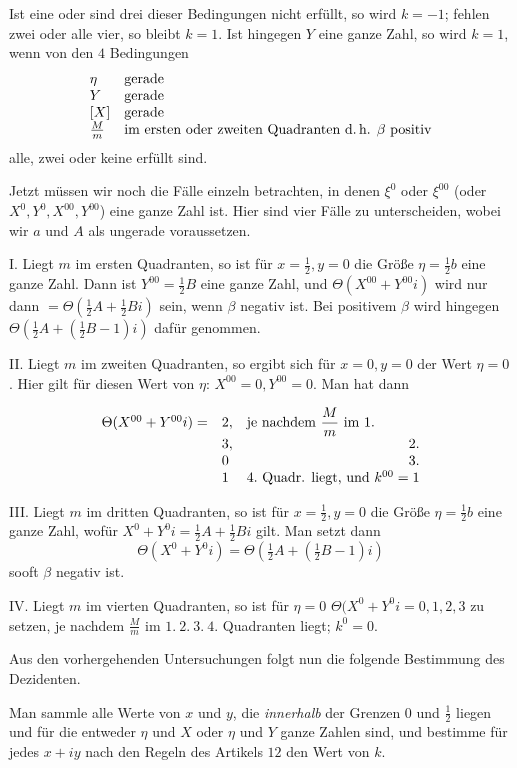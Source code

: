Ist eine oder sind drei dieser Bedingungen nicht erfüllt, so wird $k=-1$; fehlen zwei oder alle vier, so bleibt $k=1$. Ist hingegen $Y$ eine ganze Zahl, so wird $k=1$, wenn von den $4$ Bedingungen
\[
\begin{array}{ll}
\eta&\text{gerade}\\
Y&\text{gerade}\\
\relax[X]&\text{gerade}\\
\frac{M}{m}&\text{im ersten oder zweiten Quadranten d.\,h. }\beta\text{ positiv}
\end{array}
\]
alle, zwei oder keine erfüllt sind.

Jetzt müssen wir noch die Fälle einzeln betrachten, in denen $\xi^0$ oder $\xi^{00}$ (oder $X^0,Y^0,X^{00},Y^{00}$) eine ganze Zahl ist. Hier sind vier Fälle zu unterscheiden, wobei wir $a$ und $A$ als ungerade voraussetzen.

I. Liegt $m$ im ersten Quadranten, so ist für $x=\frac12,y=0$ die Größe $\eta=\frac12b$ eine ganze Zahl. Dann ist $Y^{00}=\frac12B$ eine ganze Zahl, und $\Theta(X^{00}+Y^{00}i)$ wird nur dann $=\Theta(\frac12A+\frac12Bi)$ sein, wenn $\beta$ negativ ist. Bei positivem $\beta$ wird hingegen $\Theta(\frac12A+(\frac12B-1)i)$ dafür genommen.

II. Liegt $m$ im zweiten Quadranten, so ergibt sich für $x=0,y=0$ der Wert $\eta=0$. Hier gilt für diesen Wert von $\eta$: $X^{00}=0,Y^{00}=0$. Man hat dann

\[
\begin{array}{rll}
\Theta(X^{00}+Y^{00}i)=&2,&\text{je nachdem }\dfrac{M}{m}\text{ im }1.\\
&3,&\hfill2.\\
&0&\hfill3.\\
&1&\hfill4.\text{ Quadr. liegt, und }k^{00}=1
\end{array}
\]

III. Liegt $m$ im dritten Quadranten, so ist für $x=\frac12,y=0$ die Größe $\eta=\frac12b$ eine ganze Zahl, wofür $X^0+Y^0i=\frac12A+\frac12Bi$ gilt. Man setzt dann
\[
\Theta(X^0+Y^0i)=\Theta(\tfrac12A+(\tfrac12B-1)i)
\]
sooft $\beta$ negativ ist.

IV. Liegt $m$ im vierten Quadranten, so ist für $\eta=0$
$\Theta(X^0+Y^0i=0,1,2,3$ zu setzen, je nachdem $\frac{M}{m}$ im $1.\ 2.\ 3.\ 4.$ Quadranten liegt;
$k^0=0$.

Aus den vorhergehenden Untersuchungen folgt nun die folgende Bestimmung des Dezidenten.

Man sammle alle Werte von $x$ und $y$, die \emph{innerhalb} der Grenzen $0$ und $\frac12$ liegen und für die entweder $\eta$ und $X$ oder $\eta$ und $Y$ ganze Zahlen sind, und bestimme für jedes $x+iy$ nach den Regeln des Artikels $12$ den Wert von $k$.

